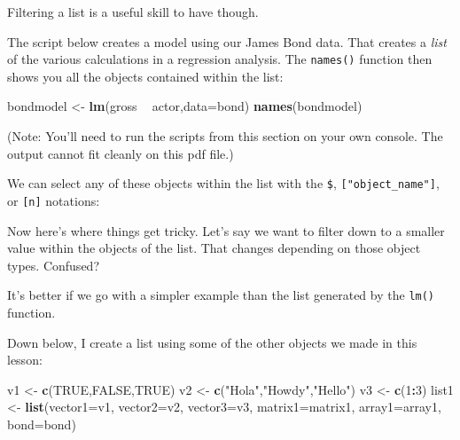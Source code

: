 \documentclass[
]{book}
\newenvironment{Shaded}{\begin{snugshade}}{\end{snugshade}}
\newcommand{\DataTypeTok}[1]{\textcolor[rgb]{0.13,0.29,0.53}{#1}}
\newcommand{\DecValTok}[1]{\textcolor[rgb]{0.00,0.00,0.81}{#1}}
\newcommand{\KeywordTok}[1]{\textcolor[rgb]{0.13,0.29,0.53}{\textbf{#1}}}
\newcommand{\NormalTok}[1]{#1}
\newcommand{\OperatorTok}[1]{\textcolor[rgb]{0.81,0.36,0.00}{\textbf{#1}}}
\newcommand{\OtherTok}[1]{\textcolor[rgb]{0.56,0.35,0.01}{#1}}
\newcommand{\StringTok}[1]{\textcolor[rgb]{0.31,0.60,0.02}{#1}}
\begin{document}
\begin{center}
Filtering a list is a useful skill to have though.

The script below creates a model using our James Bond data. That creates a \emph{list} of the various calculations in a regression analysis. The \texttt{names()} function then shows you all the objects contained within the list:

\begin{Shaded}
\begin{Highlighting}[]
\NormalTok{bondmodel <-}\StringTok{ }\KeywordTok{lm}\NormalTok{(gross }\OperatorTok{~}\StringTok{ }\NormalTok{actor,}\DataTypeTok{data=}\NormalTok{bond)}
\KeywordTok{names}\NormalTok{(bondmodel)}
\end{Highlighting}
\end{Shaded}

(Note: You'll need to run the scripts from this section on your own console. The output cannot fit cleanly on this pdf file.)

We can select any of these objects within the list with the \texttt{\$}, \texttt{{[}"object\_name"{]}}, or \texttt{{[}n{]}} notations:

\begin{Shaded}
\end{Shaded}

Now here's where things get tricky. Let's say we want to filter down to a smaller value within the objects of the list. That changes depending on those object types. Confused?

It's better if we go with a simpler example than the list generated by the \texttt{lm()} function.

Down below, I create a list using some of the other objects we made in this lesson:

\begin{Shaded}
\begin{Highlighting}[]
\NormalTok{v1 <-}\StringTok{ }\KeywordTok{c}\NormalTok{(}\OtherTok{TRUE}\NormalTok{,}\OtherTok{FALSE}\NormalTok{,}\OtherTok{TRUE}\NormalTok{)}
\NormalTok{v2 <-}\StringTok{ }\KeywordTok{c}\NormalTok{(}\StringTok{"Hola"}\NormalTok{,}\StringTok{"Howdy"}\NormalTok{,}\StringTok{"Hello"}\NormalTok{)}
\NormalTok{v3 <-}\StringTok{ }\KeywordTok{c}\NormalTok{(}\DecValTok{1}\OperatorTok{:}\DecValTok{3}\NormalTok{)}
\NormalTok{list1 <-}\StringTok{ }\KeywordTok{list}\NormalTok{(}\DataTypeTok{vector1=}\NormalTok{v1,}
              \DataTypeTok{vector2=}\NormalTok{v2,}
              \DataTypeTok{vector3=}\NormalTok{v3,}
              \DataTypeTok{matrix1=}\NormalTok{matrix1,}
              \DataTypeTok{array1=}\NormalTok{array1,}
              \DataTypeTok{bond=}\NormalTok{bond)}
\end{Highlighting}
\end{Shaded}


\end{center}
\end{document}
